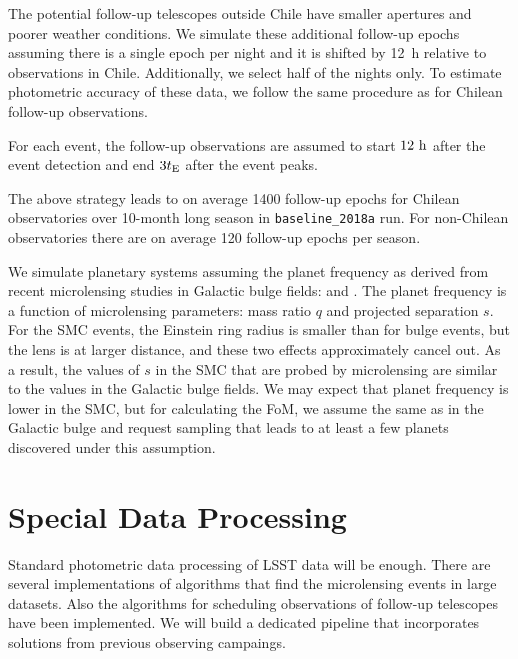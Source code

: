 \documentclass[12pt,letterpaper]{article}
\begin{document}
The potential follow-up telescopes outside Chile have smaller apertures and 
poorer weather conditions.  We simulate these additional follow-up epochs 
assuming there is a single epoch per night and it is shifted by 12~h 
relative to observations in Chile.  Additionally, we select half of 
the nights only.  To estimate photometric accuracy of these data, we follow 
the same procedure as for Chilean follow-up observations.

For each event, the follow-up observations are assumed to start $12~{\rm h}$ 
after the event detection and end $3t_{\rm E}$ after the event peaks.

The above strategy leads to on average 1400 follow-up epochs for 
Chilean observatories over 10-month long season in {\tt baseline\_2018a} run. 
For non-Chilean observatories there are on average 120 follow-up 
epochs per season.  

We simulate planetary systems assuming the planet frequency 
as derived from recent microlensing studies in Galactic bulge fields:
\citet{suzuki16} and \citet{udalski18b}.  The planet frequency 
is a function of microlensing parameters: 
mass ratio $q$ and projected separation $s$.
For the SMC events, the Einstein ring radius is smaller than for bulge events, 
but the lens is at larger distance, and these two effects approximately cancel out.  
As a result, the values of $s$ in the SMC that are probed by microlensing are similar 
to the values in the Galactic bulge fields.  %
We may expect that planet frequency is lower in the SMC, but for 
calculating the FoM, we assume the same as in the Galactic bulge 
and request sampling that leads to at least a few planets discovered under this assumption. 



\vspace{.6in}

\section{Special Data Processing}

Standard photometric data processing of LSST data will be enough.  
There are several implementations of algorithms that find 
the microlensing events in large datasets.  Also the algorithms for 
scheduling observations of follow-up telescopes have been implemented.  
We will build a dedicated pipeline that incorporates solutions from previous 
observing campaings. 
\end{document}
